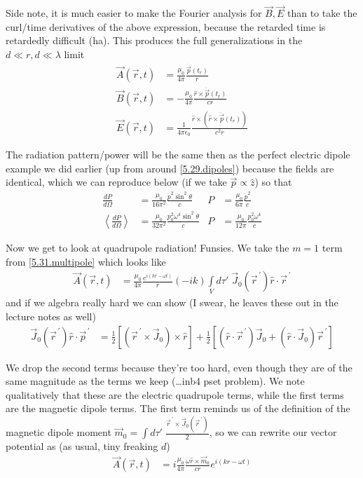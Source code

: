 \documentclass[10pt]{report}
\newcommand{\rd}[2]{\frac{d#1}{d#2}}
\newcommand{\pvec}[1]{\vec{#1}^{\,\prime}}
\newcommand{\expvalue}[1]{\left<#1\right>}
\begin{document}
Side note, it is much easier to make the Fourier analysis for $\vec{B}, \vec{E}$ than to take the curl/time derivatives of the above expression, because the retarded time is retardedly difficult (ha). This produces the full generalizations in the $d \ll r, d \ll \lambda$ limit
\begin{align}
    \vec{A}(\vec{r},t) &= \frac{\mu_0}{4\pi}\frac{\dot{\vec{p}}(t_r)}{r}\\
    \vec{B}(\vec{r},t) &= -\frac{\mu_0}{4\pi} \frac{\hat{r} \times \ddot{\vec{p}}(t_r)}{cr}\\
    \vec{E}(\vec{r},t) &= \frac{1}{4\pi\epsilon_0} \frac{\hat{r} \times \left( \hat{r} \times \ddot{\vec{p}}(t_r) \right)}{c^2r}
\end{align}

The radiation pattern/power will be the same then as the perfect electric dipole example we did earlier (up from around \eqref{5.29.dipoles}) because the fields are identical, which we can reproduce below (if we take $\vec{p} \propto \hat{z}$) so that
\begin{align}
    \rd{P}{\Omega} &= \frac{\mu_0}{16 \pi^2}\frac{\ddot{p}^2\sin^2\theta}{c} & P &= \frac{\mu_0}{6\pi}\frac{\ddot{p}^2}{c}\\
    \expvalue{\rd{P}{\Omega}} &= \frac{\mu_0}{32 \pi^2}\frac{p_0^2\omega^4\sin^2\theta}{c} & P &= \frac{\mu_0}{12\pi}\frac{p_0^2\omega^4}{c}
\end{align}

Now we get to look at quadrupole radiation! Funsies. We take the $m=1$ term from \eqref{5.31.multipole} which looks like
\begin{align}
    \vec{A}(\vec{r},t) &= \frac{\mu_0}{4\pi}\frac{e^{i(kr - \omega t)}}{r}(-ik)\int\limits_{V}^{}d\tau'\;\vec{J}_0(\pvec{r})\hat{r} \cdot \pvec{r}\label{5.31.M1}
\end{align}
and if we algebra really hard we can show (I swear, he leaves these out in the lecture notes as well)
\begin{align}
    \vec{J}_0(\pvec{r})\hat{r} \cdot \pvec{p} &= \frac{1}{2}\left[ \left( \pvec{r} \times \vec{J}_0 \right) \times \hat{r} \right] + \frac{1}{2}\left[ (\hat{r} \cdot \pvec{r})\vec{J}_0 + \left( \hat{r} \cdot \vec{J}_0 \right)\pvec{r} \right]
\end{align}

We drop the second terms because they're too hard, even though they are of the same magnitude as the terms we keep (\dots inb4 pset problem). We note qualitatively that these are the electric quadrupole terms, while the first terms are the magnetic dipole terms. The first term reminds us of the definition of the magnetic dipole moment $\vec{m}_0 = \int d\tau'\; \frac{\pvec{r} \times \vec{J}_0(\pvec{r})}{2}$, so we can rewrite our vector potential as (as usual, tiny freaking $d$)
\begin{align}
    \vec{A}(\vec{r},t) &= i\frac{\mu_0}{4\pi}\frac{\omega \hat{r} \times \vec{m}_0}{cr}e^{i(kr - \omega t)}
\end{align}
\end{document}
